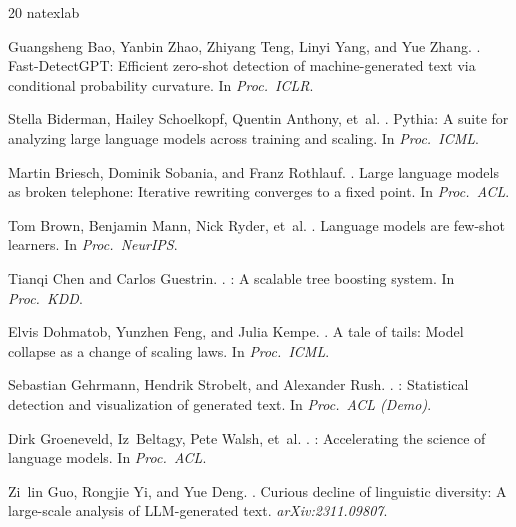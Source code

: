 \documentclass[11pt]{article}
\begin{document}
\begin{thebibliography}{20}
\expandafter\ifx\csname natexlab\endcsname\relax\def\natexlab#1{#1}\fi

Guangsheng Bao, Yanbin Zhao, Zhiyang Teng, Linyi Yang, and Yue Zhang.
.
\newblock Fast-{D}etect{GPT}: Efficient zero-shot detection of machine-generated text via conditional probability curvature.
\newblock In \emph{Proc.\ ICLR}.

Stella Biderman, Hailey Schoelkopf, Quentin Anthony, et~al.
.
\newblock Pythia: A suite for analyzing large language models across training and scaling.
\newblock In \emph{Proc.\ ICML}.

Martin Briesch, Dominik Sobania, and Franz Rothlauf.
.
\newblock Large language models as broken telephone: Iterative rewriting converges to a fixed point.
\newblock In \emph{Proc.\ ACL}.

Tom Brown, Benjamin Mann, Nick Ryder, et~al.
.
\newblock Language models are few-shot learners.
\newblock In \emph{Proc.\ NeurIPS}.

Tianqi Chen and Carlos Guestrin.
.
: A scalable tree boosting system.
\newblock In \emph{Proc.\ KDD}.

Elvis Dohmatob, Yunzhen Feng, and Julia Kempe.
.
\newblock A tale of tails: Model collapse as a change of scaling laws.
\newblock In \emph{Proc.\ ICML}.

Sebastian Gehrmann, Hendrik Strobelt, and Alexander Rush.
.
: Statistical detection and visualization of generated text.
\newblock In \emph{Proc.\ ACL (Demo)}.

Dirk Groeneveld, Iz~Beltagy, Pete Walsh, et~al.
.
: Accelerating the science of language models.
\newblock In \emph{Proc.\ ACL}.

Zi~lin Guo, Rongjie Yi, and Yue Deng.
.
\newblock Curious decline of linguistic diversity: A large-scale analysis of {LLM}-generated text.
\newblock \emph{arXiv:2311.09807}.


\end{thebibliography}
\end{document}
